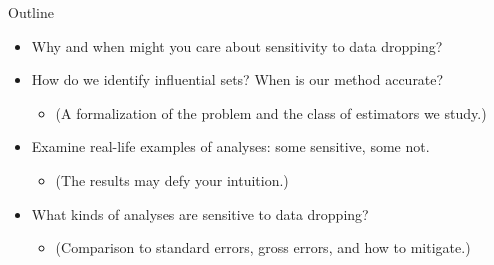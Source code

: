

\begin{frame}{Outline}
\begin{itemize}
    \item Why and when might you care about sensitivity to data dropping?
    \item How do we identify influential sets?  When is our method accurate?
    \begin{itemize}
        \item[] (A formalization of the problem and the
            class of estimators we study.)
    \end{itemize}
    \item Examine real-life examples of analyses: some sensitive, some not.
    \begin{itemize}
        \item[] (The results may defy your intuition.)
    \end{itemize}
    \item What kinds of analyses are sensitive to data dropping?
    \begin{itemize}
    \item[] (Comparison to standard errors, gross errors, and how to mitigate.)
    \end{itemize}
\end{itemize}
\end{frame}


